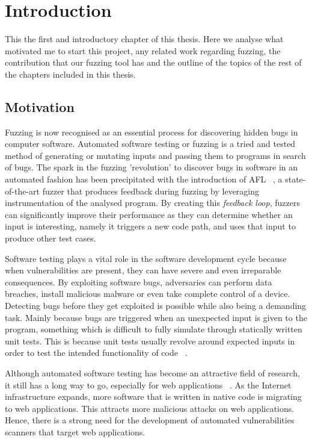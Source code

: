 \chapter{Introduction}
\minitoc
\vspace*{1cm}

This the first and introductory chapter of this thesis. Here we analyse what motivated me to start this project, any related work regarding fuzzing, the contribution that our fuzzing tool has and the outline of the topics of the rest of the chapters included in this thesis.

\section{Motivation}
Fuzzing is now recognised as an essential process for discovering hidden bugs in computer software. Automated software testing or fuzzing is a tried and tested method of generating or mutating inputs and passing them to programs in search of bugs. The spark in the fuzzing 'revolution' to discover bugs in software in an automated fashion has been precipitated with the introduction of AFL ~\cite{zalewski2015american}, a state-of-the-art fuzzer that produces feedback during fuzzing by leveraging instrumentation of the analysed program. By creating this \textit{feedback loop}, fuzzers can significantly improve their performance as they can determine whether an input is interesting, namely it triggers a new code path, and uses that input to produce other test cases.

Software testing plays a vital role in the software development cycle because when vulnerabilities are present, they can have severe and even irreparable consequences. By exploiting software bugs, adversaries can perform data breaches, install malicious malware or even take complete control of a device. Detecting bugs before they get exploited is possible while also being a demanding task. Mainly because bugs are triggered when an unexpected input is given to the program, something which is difficult to fully simulate through statically written unit tests. This is because unit tests usually revolve around expected inputs in order to test the intended functionality of code ~\cite{aschermann2019nautilus}.

Although automated software testing has become an attractive field of research, it still has a long way to go, especially for web applications ~\cite{doupe2010johnny}. As the Internet infrastructure expands, more software that is written in native code is migrating to web applications. This attracts more malicious attacks on web applications. Hence, there is a strong need for the development of automated vulnerabilities scanners that target web applications.
 
